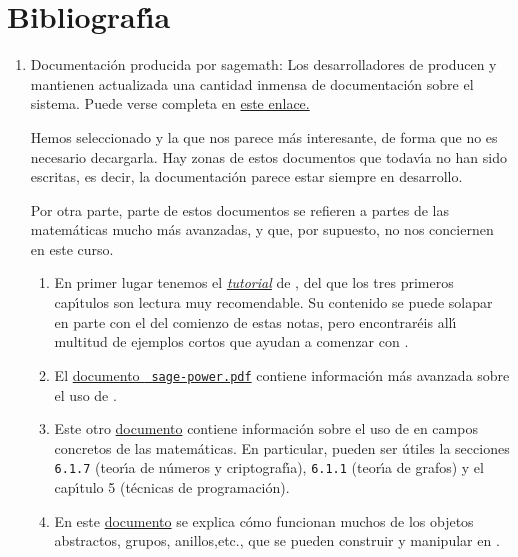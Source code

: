 \section{Bibliograf\'{\i}a}



\begin{enumerate}
 \item {\sc Documentaci\'on producida por sagemath:} Los desarrolladores de
{\sage} producen y mantienen actualizada una cantidad inmensa de documentaci\'on
sobre el sistema. Puede verse completa en 
\href{http://www.sagemath.org/help.html#SageStandardDoc}{este enlace.}

Hemos seleccionado y la que nos parece m\'as interesante, de forma que no es
necesario decargarla. Hay zonas de estos documentos que todav\'{\i}a no han sido
escritas, es decir, la documentaci\'on parece estar siempre en desarrollo.
 
 Por otra parte, parte de estos documentos se refieren a partes de las
matem\'aticas mucho m\'as avanzadas, y que, por supuesto, no nos conciernen en
este curso.
 
 \begin{enumerate}
 \item En primer lugar tenemos el 
 \href{http://150.244.21.37/PDFs/SAGE-DOCS/SageTutorial.pdf}{{\itshape tutorial}} de
{\sage}, del que los tres primeros cap\'{\i}tulos son lectura muy recomendable.
Su contenido se puede solapar en parte con el del comienzo de estas notas, pero
encontrar\'eis all\'{\i} multitud de ejemplos cortos que ayudan a comenzar con
{\sage}.

\item  El \href{http://150.244.21.37/PDFs/SAGE-DOCS/sage-power.pdf}{documento {\tt
sage-power.pdf}} contiene informaci\'on m\'as avanzada sobre el uso de {\sage}.

\item Este otro
\href{http://150.244.21.37/PDFs/SAGE-DOCS/thematic_tutorials.pdf}{documento} contiene
informaci\'on sobre el uso de {\sage} en campos concretos de las matem\'aticas.
En particular, pueden ser \'utiles la secciones  {\tt 6.1.7} (teor\'{\i}a de
n\'umeros y criptograf\'{\i}a),  {\tt 6.1.1} (teor\'{\i}a de grafos) y el
cap\'{\i}tulo 5 (t\'ecnicas de programaci\'on). 
 \item En este \href{http://150.244.21.37/PDFs/SAGE-DOCS/constructions.pdf}{documento} se
explica c\'omo funcionan muchos de los objetos abstractos, grupos, anillos,etc.,
 que  se pueden construir y manipular en {\sage}. 
 \end{enumerate}
 

\end{enumerate}
